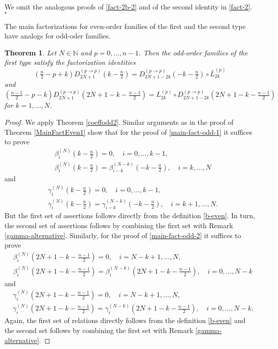 \documentclass[a4paper,12pt,reqno]{amsart}
\newtheorem{theorem}{Theorem}
\numberwithin{theorem}{subsection}
\numberwithin{equation}{section}
\begin{document}
We omit the analogous proofs of \eqref{fact-2b-2} and of the second identity in
\eqref{fact-2}. \hfill $\square$

The main factorizations for even-order families of the first and the second
type have analogs for odd-oder families.

\begin{theorem}\label{MainFactOdd1} Let $N \in {\mathbb{N}}$ and $p=0,\dots,n-1$. Then the
odd-order families of the first type satisfy the factorization identities
\begin{equation}\label{main-fact-odd-1}
   (\tfrac{n}{2}\!-\!p\!+\!k) D_{2N+1}^{(p\to p)} (k\!-\!\tfrac{n}{2})
   = D_{2N+1-2k}^{(p\to p)}(-k\!-\!\tfrac{n}{2}) \circ \bar{L}_{2k}^{(p)}
\end{equation}
and
\begin{equation}\label{main-fact-odd-2}
   (\tfrac{n-1}{2}\!-\!p-\!k\!) D_{2N+1}^{(p\to p)}(2N\!+\!1\!-\!k\!-\!\tfrac{n-1}{2}) =
   L_{2k}^{(p)} \circ D_{2N+1-2k}^{(p\to p)}(2N\!+\!1\!-\!k\!-\!\tfrac{n-1}{2})
\end{equation}
for $k=1,\dots,N$.
\end{theorem}

\begin{proof} We apply Theorem \ref{coeffodd2}. Similar arguments as in the proof of
Theorem \ref{MainFactEven1} show that for the proof of \eqref{main-fact-odd-1}
it suffices to prove
\begin{align*}
   & \beta_i^{(N)}(k\!-\!\tfrac{n}{2}) = 0, \quad i=0,\dots,k-1, \\
   & \beta_i^{(N)}(k\!-\!\tfrac{n}{2}) = \beta_{i-k}^{(N-k)}(-k\!-\!\tfrac{n}{2}), \quad i=k,\dots,N
\end{align*}
and
\begin{align*}
   & \gamma_i^{(N)}(k\!-\!\tfrac{n}{2}) = 0, \quad i=0,\dots,k-1, \\
   & \gamma_i^{(N)}(k\!-\!\tfrac{n}{2}) = \gamma_{i-k}^{(N-k)}(-k\!-\!\tfrac{n}{2}), \quad i=k+1,\dots,N.
\end{align*}
But the first set of assertions follows directly from the definition
\eqref{b-even}. In turn, the second set of assertions follows by combining the
first set with Remark \ref{gamma-alternative}. Similarly, for the proof of
\eqref{main-fact-odd-2} it suffices to prove
\begin{align*}
   & \beta_i^{(N)}(2N\!+\!1\!-\!k\!-\!\tfrac{n-1}{2}) = 0, \quad i=N-k+1,\dots,N, \\
   & \beta_i^{(N)}(2N\!+\!1\!-\!k\!-\!\tfrac{n-1}{2}) = \beta_{i}^{(N-k)}(2N\!+\!1\!-\!k\!-\!\tfrac{n-1}{2}),
   \quad i=0,\dots,N-k
\end{align*}
and
\begin{align*}
   & \gamma_i^{(N)}(2N\!+\!1\!-\!k\!-\!\tfrac{n-1}{2}) = 0, \quad i=N-k+1,\dots,N, \\
   & \gamma_i^{(N)}(2N\!+\!1\!-\!k\!-\!\tfrac{n-1}{2}) = \gamma_{i}^{(N-k)}(2N\!+\!1\!-\!k\!-\!\tfrac{n-1}{2}),
   \quad i=0,\dots,N-k.
\end{align*}
Again, the first set of relations directly follows from the definition
\eqref{b-even} and the second set follows by combining the first set with
Remark \ref{gamma-alternative}.
\end{proof}
\end{document}
